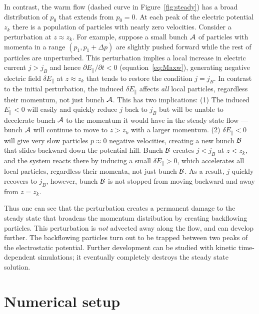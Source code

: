In contrast, the warm flow (dashed curve in Figure~\ref{fig:steady}) has a broad distribution
of $p_0$ that extends from $p_0=0$. At each peak of the electric potential
$z_k$ there is a population of particles with nearly zero velocities. Consider a
perturbation at $z\approx z_k$. For example, suppose
a small bunch ${\cal A}$ of particles with momenta in a range $(p_1,p_1+\Delta p)$
are slightly pushed forward while the rest of particles are unperturbed.
This perturbation implies a local increase in electric current $j>j_B$ and hence
$\partial E_\parallel/\partial t<0$ (equation~\ref{eq:Maxw}), generating negative
electric field $\delta E_\parallel$ at $z\approx z_k$ that tends to restore the
condition $j=j_B$. In contrast to the initial perturbation,
the induced $\delta E_\parallel$ affects {\it all} local particles, regardless their
momentum, not just bunch ${\cal A}$. This has two implications:
(1) The induced $E_\parallel<0$ will easily and quickly reduce $j$ back to $j_B$ but
will be unable to decelerate bunch ${\cal A}$ to the momentum it would have in the
steady state flow --- bunch ${\cal A}$ will continue to move to $z>z_k$ with a larger
momentum.
(2) $\delta E_\parallel<0$ will give very slow particles $p\approx 0$ negative velocities,
creating a new bunch ${\cal B}$ that slides backward down the potential hill. Bunch ${\cal B}$
creates $j<j_B$ at $z<z_k$, and the system reacts there by inducing a small
$\delta E_\parallel > 0$, which accelerates all local particles, regardless their momenta,
not just bunch ${\cal B}$. As a result, $j$ quickly recovers to $j_B$, however, bunch ${\cal B}$
is not stopped from moving backward and away from $z=z_k$.

Thus one can see that the perturbation creates a permanent damage
to the steady state that broadens the momentum distribution by creating backflowing
particles.
This perturbation is {\it not} advected away along the flow, and can develop further.
The backflowing particles turn out to be trapped between two peaks of the
electrostatic potential. Further development can be studied with kinetic time-dependent
simulations; it eventually completely destroys the steady state solution.



\section{Numerical setup}
\label{sec:pc-setup}


